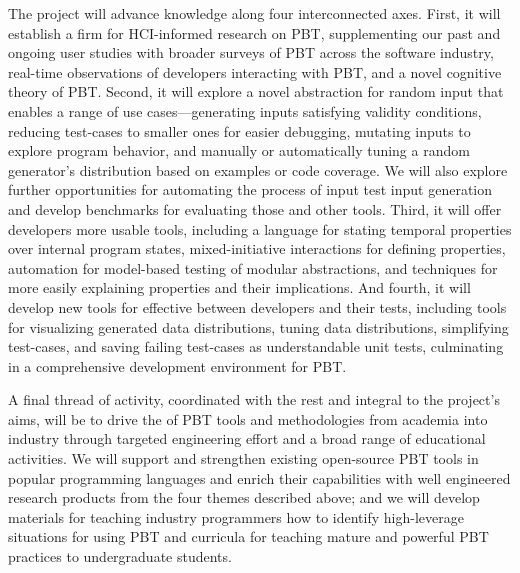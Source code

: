 The project will advance knowledge along four
\iflater {} \fi
interconnected axes.
%
First, it will establish a firm  for HCI-informed
research on PBT, supplementing our past and ongoing user studies with
broader surveys of PBT across the software industry, real-time
observations of developers interacting with PBT, and a novel cognitive
theory of PBT.
%
Second, it will explore a novel abstraction for random input  that enables a range of use cases---generating inputs
satisfying validity conditions, reducing test-cases to smaller ones for easier
debugging,
mutating inputs to explore program behavior,
and manually or automatically tuning a random
generator's distribution based on examples or code coverage. We will also
explore further opportunities for automating the process of input test input
generation and develop benchmarks for evaluating those and other tools.
%
Third, it will offer developers more usable  tools,
including a language for stating temporal properties over internal
program states, mixed-initiative interactions for defining properties,
automation for model-based testing of
modular abstractions, and techniques for more easily explaining properties and
their implications.
%
And fourth, it will develop new tools for effective  between developers and their tests, including tools for
visualizing generated data
distributions, tuning data distributions, simplifying test-cases, and saving
  failing test-cases as understandable unit tests, culminating in a
  comprehensive development environment for PBT.

A final thread of activity, coordinated with the rest and integral to the
project's aims, will
%
be to drive the  of PBT tools and
methodologies from academia into industry through targeted engineering effort
and a broad range of educational activities.
We will support and strengthen existing
open-source PBT tools in popular programming languages and enrich their
capabilities with well engineered research products from the four
themes described above;
%
and we will
develop materials for teaching industry programmers how to identify
high-leverage situations for using PBT and curricula for teaching mature
and powerful PBT practices to undergraduate students.  
%

